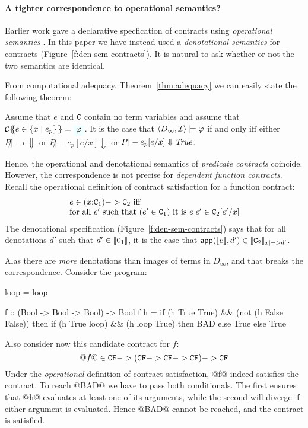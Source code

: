 
\paragraph{A tighter correspondence to operational semantics?}

Earlier work gave a declarative specfication of contracts using
\emph{operational semantics} \cite{xu+:contracts}.  In this paper we have
instead used a \emph{denotational semantics} for contracts (Figure~\ref{f:den-sem-contracts}).
It is natural to ask whether or not the two semantics are identical.

From computational adequacy, Theorem~\ref{thm:adequacy} we can easily state
the following theorem: 
\begin{corollary} Assume that $e$ and $\Ct$ contain no term variables and 
assume that $\ctrans{}{\cdot}{e \in \{x \mid e_p\}} = \formula{\phi}$. It is the case 
that $\langle D_\infty,{\cal I}\rangle \models \phi$ if and only iff either
$P \not|- e \Downarrow$ or $P \not|- e_p[e/x] \Downarrow$ or $P |- e_p[e/x] \Downarrow \True$. \end{corollary}
Hence, the operational and denotational semantics of \emph{predicate contracts} coincide.
However, the correspondence is not precise for \emph{dependent function contracts}.
Recall the operational definition of contract satisfaction for 
a function contract:
\[\begin{array}{l} 
   e \in (x{:}\Ct_1) -> \Ct_2 \text{ iff} \\
   \text{for all } e' \text{ such that } (e' \in \Ct_1) \text{ it is } e\;e' \in \Ct_2[e'/x]
\end{array}\] 
The denotational specification (Figure~\ref{f:den-sem-contracts}) 
says that for all denotations $d'$ such that
$d' \in \dbrace{\Ct_1}$, it is the case that 
$\dapp(\dbrace{e},d') \in \dbrace{\Ct_2}_{x |->d'}$. 
 
Alas there are {\em more} denotations than images of terms in $D_{\infty}$,
and that breaks the correspondence. Consider the program:
\begin{code}
  loop = loop

  f :: (Bool -> Bool -> Bool) -> Bool
  f h = if (h True True) && (not (h False False))
        then if (h True loop) && (h loop True)
             then BAD else True
        else True
\end{code}
Also consider now this candidate contract for $f$:
\[ @f@ \in \CF -> (\CF -> \CF -> \CF) -> \CF \]
Under the \emph{operational} definition of contract satisfaction, 
@f@ indeed satisfies the contract.
To reach @BAD@ we have to pass both conditionals.
The first ensures that @h@ evaluates at least one of its
arguments, while the second will diverge if either argument is evaluated.
Hence @BAD@ cannot be reached, and the contract is satisfied. 

